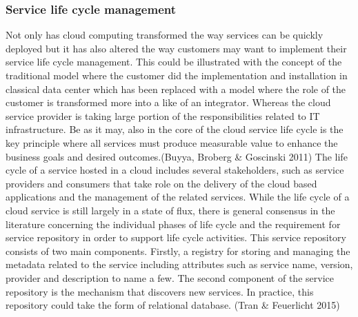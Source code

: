 \documentclass{article}
\begin{document}
\subsubsection{Service life cycle management}
Not only has cloud computing transformed the way services can be quickly deployed but it has also altered the way customers may want to implement their service life cycle management.
This could be illustrated with the concept of the traditional model where the customer did the implementation and installation in classical data center which has been replaced with a model where the role of the customer is transformed more into a like of an integrator. Whereas the cloud service provider is taking large portion of the responsibilities related to IT infrastructure. Be as it may, also in the core of the cloud service life cycle is the key principle where all services must produce measurable value to enhance the business goals and desired outcomes.(Buyya, Broberg \& Goscinski 2011)
The life cycle of a service hosted in a cloud includes several stakeholders, such as service providers and consumers that take role on the delivery of the cloud based applications and the management of the related services. While the life cycle of a cloud service is still largely in a state of flux, there is general consensus in the literature concerning the individual phases of life cycle and the requirement for service repository in order to support life cycle activities.
This service repository consists of two main components. Firstly, a registry for storing and managing the metadata related to the service including attributes such as service name, version, provider and description to name a few. The second component of the service repository is the mechanism that discovers new services. In practice, this repository could take the form of relational database. (Tran \& Feuerlicht 2015)
\par
\end{document}
